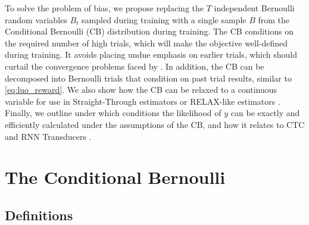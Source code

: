 \documentclass{article}
\begin{document}
To solve the problem of bias, we propose replacing the $T$ independent
Bernoulli random variables $B_t$ sampled during training with a single sample
$B$ from the Conditional Bernoulli (CB) distribution during training. The CB
conditions on the required number of high trials, which will make the objective
well-defined during training. It avoids placing undue emphasis on earlier
trials, which should curtail the convergence problems faced by
\citet{luoLearningOnlineAlignments2017}. In addition, the CB can be decomposed
into Bernoulli trials that condition on past trial results, similar to
\cref{eq:luo_reward}. We also show how the CB can be relaxed to a continuous
variable for use in Straight-Through estimators
\cite{bengioEstimatingPropagatingGradients2013,jangCategoricalReparameterizationGumbelSoftmax2017}
or RELAX-like estimators
\cite{maddisonConcreteDistributionContinuous2017,grathwohlBackpropagationVoidOptimizing2018}.
Finally, we outline under which conditions the likelihood of $y$ can be exactly
and efficiently calculated under the assumptions of the CB, and how it relates
to CTC and RNN Transducers \cite{gravesSequenceTransductionRecurrent2012}.

\section{The Conditional Bernoulli} \label{sec:cb}
\subsection{Definitions} \label{sec:cb_defns}
\end{document}
